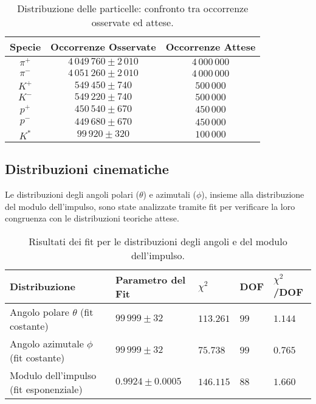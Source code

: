 \documentclass[a4paper,11pt]{article}
\begin{document}
\begin{table}[h!]
    \centering
    \begin{tabular}{|c|c|c|}
        \hline
        \textbf{Specie} & \textbf{Occorrenze Osservate} & \textbf{Occorrenze Attese} \\
        \hline
        $\pi^+$ & $4\,049\,760 \pm 2\,010$ & $4\,000\,000$ \\
        \hline
        $\pi^-$ & $4\,051\,260 \pm 2\,010$ & $4\,000\,000$ \\
        \hline
        $K^+$ & $549\,450 \pm 740$ & $500\,000$ \\
        \hline
        $K^-$ & $549\,220 \pm 740$ & $500\,000$ \\
        \hline
        $p^+$ & $450\,540 \pm 670$ & $450\,000$ \\
        \hline
        $p^-$ & $449\,680 \pm 670$ & $450\,000$ \\
        \hline
        $K^*$ & $99\,920 \pm 320$ & $100\,000$ \\
        \hline
    \end{tabular}
    \caption{Distribuzione delle particelle: confronto tra occorrenze osservate ed attese.}
    \label{tab:abbondanze}
\end{table}

\subsection{Distribuzioni cinematiche}

Le distribuzioni degli angoli polari ($\theta$) e azimutali ($\phi$), insieme alla distribuzione del modulo dell'impulso, sono state analizzate tramite fit per verificare la loro congruenza con le distribuzioni teoriche attese.

\begin{table}[h!]
    \centering
    \begin{tabular}{|m{3cm}|>{\centering\arraybackslash}m{3cm}|>{\centering\arraybackslash}m{1.5cm}|>{\centering\arraybackslash}m{1.5cm}|>{\centering\arraybackslash}m{1.5cm}|}
        \hline
        \textbf{Distribuzione} & \textbf{Parametro del Fit} & $\chi^2$ & \textbf{DOF} & $\chi^2$/DOF \\
        \hline
        Angolo polare $\theta$ (fit costante) & $99\,999 \pm 32$ & $113.261$ & $99$ & $1.144$ \\
        \hline
        Angolo azimutale $\phi$ (fit costante) & $99\,999 \pm 32$ & $75.738$ & $99$ & $0.765$ \\
        \hline
        Modulo dell'impulso (fit esponenziale) & $0.9924 \pm 0.0005$ & $146.115$ & $88$ & $1.660$ \\
        \hline
    \end{tabular}
    \caption{Risultati dei fit per le distribuzioni degli angoli e del modulo dell'impulso.}
    \label{tab:distribuzioni}
\end{table}
\end{document}
